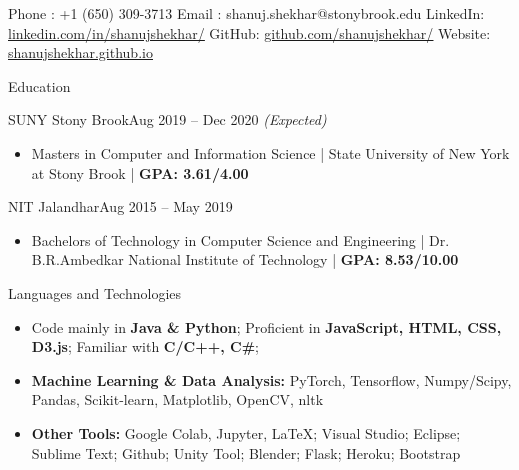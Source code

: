 \documentclass[]{mcdowellcv}
\begin{document}
	\makeheader
    \centering Phone : +1 (650) 309-3713 \hspace{1mm} \bullet \hspace{2mm} Email : shanuj.shekhar@stonybrook.edu \hspace{1mm} \bullet
    \hspace{1mm} LinkedIn: \href{https://www.linkedin.com/in/shanujshekhar/}{\underline{linkedin.com/in/shanujshekhar/}} \newline \bullet \hspace{1mm} GitHub: \hspace{1mm}\href{https://github.com/shanujshekhar/}{\underline{github.com/shanujshekhar/}} \bullet \hspace{1mm} Website: \href{https://shanujshekhar.github.io/}{\underline{shanujshekhar.github.io}}

	\begin{cvsection}{Education}
		\begin{cvsubsection}{SUNY Stony Brook}{}{Aug 2019 -- Dec 2020 \textit{(Expected)}}
			\begin{itemize}
				\item Masters in Computer and Information Science | State University of New York at Stony Brook | \textbf{GPA: 3.61/4.00}
			\end{itemize}
		\end{cvsubsection}
        \begin{cvsubsection}{NIT Jalandhar}{}{Aug 2015 -- May 2019}
			\begin{itemize}
				\item Bachelors of Technology in Computer Science and Engineering | Dr. B.R.Ambedkar National Institute of Technology | \textbf{GPA: 8.53/10.00}
			\end{itemize}
		\end{cvsubsection}
	\end{cvsection}
	
	\begin{cvsection}{Languages and Technologies}
		\begin{cvsubsection}{}{}{}	
			\begin{itemize}
				\item Code mainly in \textbf{Java \& Python}; Proficient in \textbf{JavaScript, HTML, CSS, D3.js}; Familiar with \textbf{C/C++, C\#}; 
				\item \textbf{Machine Learning \& Data Analysis:} PyTorch, Tensorflow, Numpy/Scipy, Pandas, Scikit-learn, Matplotlib, OpenCV, nltk
				\item \textbf{Other Tools:} Google Colab, Jupyter, LaTeX; Visual Studio; Eclipse; Sublime Text; Github; Unity Tool; Blender; Flask; Heroku; Bootstrap
			\end{itemize}
		\end{cvsubsection}
	\end{cvsection}
	
\end{document}
